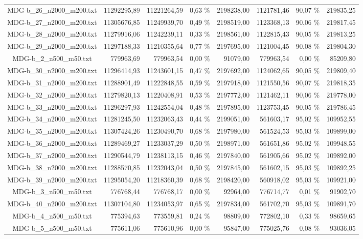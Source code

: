 \begin{landscape}
\begin{table}[ht]
\begin{tabular}{| c | r | r | r | r | r | r | r |  }
		MDG-b\_26\_n2000\_m200.txt&11292295,89&11221264,59&0,63 \%&2198238,00&1121781,46&90,07 \%&219835,25\\
		MDG-b\_27\_n2000\_m200.txt&11305676,85&11249939,70&0,49 \%&2198519,00&1123368,13&90,06 \%&219817,45\\
		MDG-b\_28\_n2000\_m200.txt&11279916,06&11242239,11&0,33 \%&2198561,00&1122815,43&90,05 \%&219813,25\\
		MDG-b\_29\_n2000\_m200.txt&11297188,33&11210355,64&0,77 \%&2197695,00&1121004,45&90,08 \%&219804,30\\
		MDG-b\_2\_n500\_m50.txt&779963,69&779963,54&0,00 \%&91079,00&779963,54&0,00 \%&85209,80\\
		MDG-b\_30\_n2000\_m200.txt&11296414,93&11243601,15&0,47 \%&2197692,00&1124062,65&90,05 \%&219809,40\\
		MDG-b\_31\_n2000\_m200.txt&11288901,49&11222848,55&0,59 \%&2197918,00&1121550,56&90,07 \%&219818,35\\
		MDG-b\_32\_n2000\_m200.txt&11279820,13&11220408,91&0,53 \%&2197772,00&1121462,11&90,06 \%&219778,00\\
		MDG-b\_33\_n2000\_m200.txt&11296297,93&11242554,04&0,48 \%&2197895,00&1123753,45&90,05 \%&219786,45\\
		MDG-b\_34\_n2000\_m200.txt&11281245,50&11232063,43&0,44 \%&2199051,00&561603,17&95,02 \%&109952,55\\
		MDG-b\_35\_n2000\_m200.txt&11307424,26&11230490,70&0,68 \%&2197980,00&561524,53&95,03 \%&109899,00\\
		MDG-b\_36\_n2000\_m200.txt&11289469,27&11233037,29&0,50 \%&2198971,00&561651,86&95,02 \%&109948,55\\
		MDG-b\_37\_n2000\_m200.txt&11290544,79&11238113,15&0,46 \%&2197840,00&561905,66&95,02 \%&109892,00\\
		MDG-b\_38\_n2000\_m200.txt&11288570,85&11232043,04&0,50 \%&2197845,00&561602,15&95,03 \%&109892,25\\
		MDG-b\_39\_n2000\_m200.txt&11295054,20&11218360,39&0,68 \%&2198420,00&560918,02&95,03 \%&109921,00\\
		MDG-b\_3\_n500\_m50.txt&776768,44&776768,17&0,00 \%&92964,00&776714,77&0,01 \%&91902,70\\
		MDG-b\_40\_n2000\_m200.txt&11307104,80&11234053,97&0,65 \%&2197834,00&561702,70&95,03 \%&109891,70\\
		MDG-b\_4\_n500\_m50.txt&775394,63&773559,81&0,24 \%&98809,00&772802,10&0,33 \%&98659,65\\
		MDG-b\_5\_n500\_m50.txt&775611,06&775610,96&0,00 \%&95847,00&775025,76&0,08 \%&93036,05\\

\end{tabular}
\end{table}
\end{landscape}
